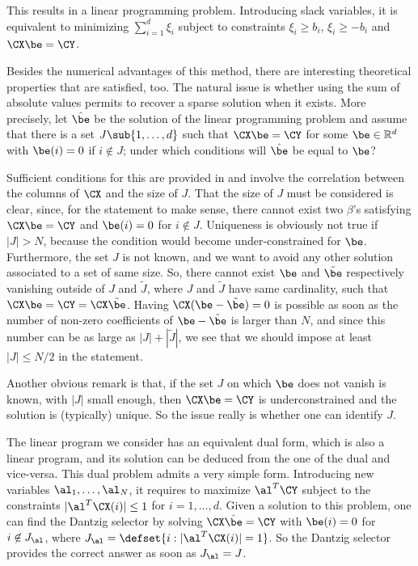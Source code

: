 This results in  a linear
programming problem. Introducing slack variables, it is 
equivalent to minimizing $\sum_{i=1}^d \xi_i$ subject to constraints
$\xi_i \geq b_i$, $\xi_i\geq -b_i$ and $\CX \be = \CY$.


Besides the numerical advantages of this method, there are interesting
theoretical properties that are satisfied, too. The natural issue is 
whether using the sum of absolute values permits to recover a sparse
solution when it exists. More precisely, let $\hat\be$ be the solution
of the linear programming problem and assume that there is a set $J\sub\{1,
\ldots, d\}$ such that $\CX\be = \CY$ for some $\be \in \mathbb R^d$
with $\be(i) = 0$ if $i\not\in J$;  under which conditions will
$\hat\be$ be equal to
$\be$? 

Sufficient conditions for this are provided in \cite{ct05} and involve
the correlation between the columns of $\CX$ and the size of $J$.
That the size of $J$ must be considered is
clear, since, for the statement to make sense, there cannot exist two
$\beta$'s satisfying $\CX\be = \CY$ and $\be(i) = 0$ for $i\not\in
J$. Uniqueness is obviously not true if $|J|>N$, because the condition
would become under-constrained for $\be$. Furthermore, the set
$J$ is not known, and we want to avoid any other solution associated
to a set of same size. So, there
cannot exist $\be$ and $\tilde\be$ respectively vanishing outside of $J$ and
$\tilde J$, where $J$ and $\tilde J$ have same cardinality, such that $\CX\be = \CY = \CX\tilde \be$. Having
$\CX(\be-\tilde\be) = 0$ is possible as soon as the number of non-zero
coefficients of $\be-\tilde\be$ is larger than $N$, and since this
number can be as large as $|J|+|\tilde J|$, we see that we should
impose at least $|J| \leq N/2$ in the statement. 


Another obvious remark is that, if the set $J$ on which $\be$ does not
vanish is known, with $|J|$ small enough, then $\CX\be = \CY$ is
underconstrained and the solution is (typically) unique. So the issue really is
whether one can identify $J$. 

The linear program we consider has an
equivalent dual form, which is also a linear program, and
its solution can be deduced from the one of the dual and
vice-versa. This dual problem admits a very simple form. Introducing
new variables $\al_1, \ldots, \al_N$, it requires
to maximize
$\al^T\CY$
subject to the constraints $|\al^T\CX(i)|\leq 1$ for $i=1, \ldots,
d$. Given a solution to this problem, one can find the Dantzig
selector by solving $\CX\hat\be = \CY$ with $\be(i) = 0$ for $i\not\in
J_\al$, where $J_\al = \defset{i:|\al^T\CX(i)| = 1}$. So the Dantzig
selector provides the correct answer as soon as $J_\al = J$.

